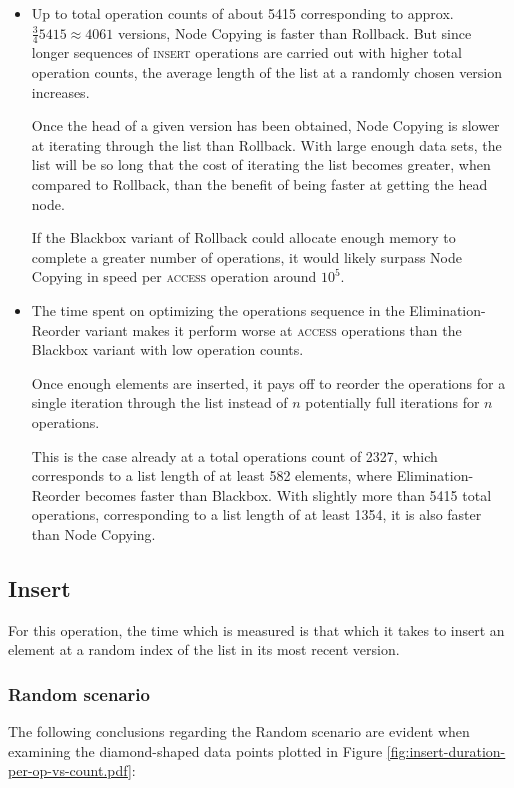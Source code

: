 \begin{itemize}

  \item Up to total operation counts of about 5415 corresponding to approx.
  $\frac{3}{4}5415 \approx 4061$ versions, Node Copying is faster than Rollback.
  But since longer sequences of \textsc{insert} operations are carried out with
  higher total operation counts, the average length of the list at a randomly
  chosen version increases.
  
  Once the head of a given version has been obtained, Node Copying is slower at
  iterating through the list than Rollback. With large enough data sets, the
  list will be so long that the cost of iterating the list becomes greater, when
  compared to Rollback, than the benefit of being faster at getting the head
  node.
  
  If the Blackbox variant of Rollback could allocate enough memory to complete a
  greater number of operations, it would likely surpass Node Copying in speed
  per \textsc{access} operation around $10^5$.

  \item The time spent on optimizing the operations sequence in the
  Elimination-Reorder variant makes it perform worse at \textsc{access}
  operations than the Blackbox variant with low operation counts.
  
  Once enough elements are inserted, it pays off to reorder the operations for a
  single iteration through the list instead of $n$ potentially full iterations
  for $n$ operations.
  
  This is the case already at a total operations count of 2327, which
  corresponds to a list length of at least 582 elements, where
  Elimination-Reorder becomes faster than Blackbox. With slightly more than 5415
  total operations, corresponding to a list length of at least 1354, it is also
  faster than Node Copying.

\end{itemize}

\subsection{Insert}
For this operation, the time which is measured is that which it takes to insert
an element at a random index of the list in its most recent version.

\subsubsection{Random scenario}
The following conclusions regarding the Random scenario are evident when
examining the diamond-shaped data points plotted in Figure
\ref{fig:insert-duration-per-op-vs-count.pdf}:

